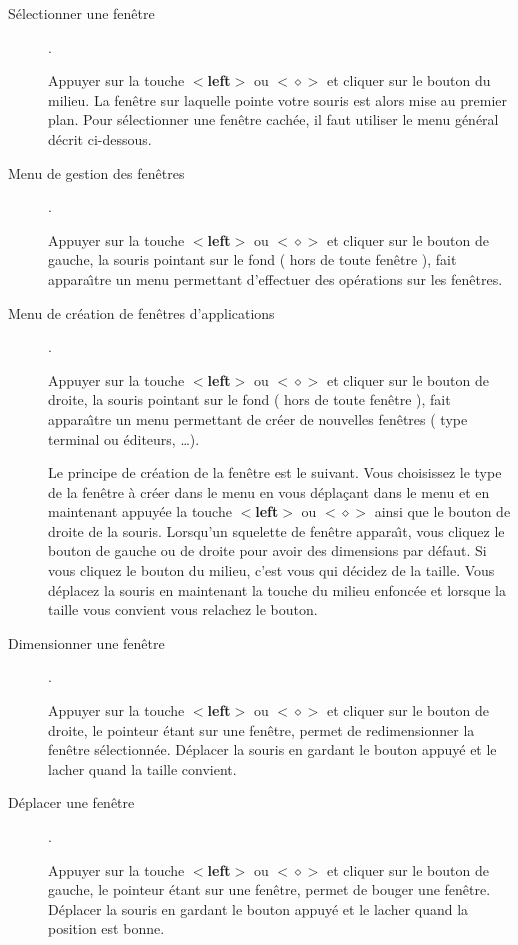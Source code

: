 \begin{description}
\item[S\'electionner une fen\^etre].

 Appuyer sur la touche $<${\bf left}$>$
 ou $<\diamond>$ et cliquer sur le bouton du milieu. La fen\^etre sur laquelle
 pointe votre souris est alors mise au premier plan. Pour s\'electionner une
 fen\^etre cach\'ee,  il faut utiliser le menu g\'en\'eral d\'ecrit ci-dessous.

\item[Menu de gestion des fen\^etres]. 

Appuyer sur la touche $<${\bf left}$>$
 ou $<\diamond>$  et cliquer sur le bouton de gauche, 
la souris pointant sur le fond ( hors de toute fen\^etre ), fait
appara\^{\i}tre un menu permettant d'effectuer des op\'erations sur
les fen\^etres.

\item[Menu de cr\'eation de fen\^etres d'applications]. 

Appuyer sur la touche
 $<${\bf left}$>$ ou $<\diamond>$  et cliquer sur le bouton de droite, 
la souris pointant sur le fond ( hors de toute fen\^etre ), fait
appara\^{\i}tre un menu permettant de cr\'eer de nouvelles fen\^etres
( type terminal ou \'editeurs, \ldots). 

 Le principe de
cr\'eation de la fen\^etre est le suivant. Vous choisissez
le type de la fen\^etre \`a cr\'eer dans le menu en vous
d\'epla\c{c}ant dans le menu et en maintenant appuy\'ee la touche
$<${\bf left}$>$ ou $<\diamond>$ ainsi que le bouton de droite de la souris.
 Lorsqu'un squelette de
fen\^etre appara\^{\i}t, vous cliquez le bouton de gauche ou de droite
pour avoir des dimensions par d\'efaut. Si vous cliquez le bouton du
milieu, c'est vous qui d\'ecidez de la taille. Vous d\'eplacez la
souris en maintenant la touche du milieu enfonc\'ee et lorsque la
taille vous convient vous relachez le bouton.

\item[Dimensionner une fen\^etre]. 

Appuyer sur la touche $<${\bf left}$>$ ou
 $<\diamond>$  et cliquer sur le bouton de droite, le pointeur \'etant sur une
 fen\^etre, permet de redimensionner la fen\^etre
 s\'electionn\'ee. D\'eplacer la souris en gardant le bouton appuy\'e et
le lacher quand la taille convient.

\item[D\'eplacer une fen\^etre].

 Appuyer sur la touche $<${\bf left}$>$ ou
 $<\diamond>$  et cliquer sur le bouton de gauche, le pointeur \'etant sur une
 fen\^etre, permet de bouger une fen\^etre. D\'eplacer la souris en gardant le
 bouton appuy\'e et le lacher quand la position est bonne.


\end{description}
